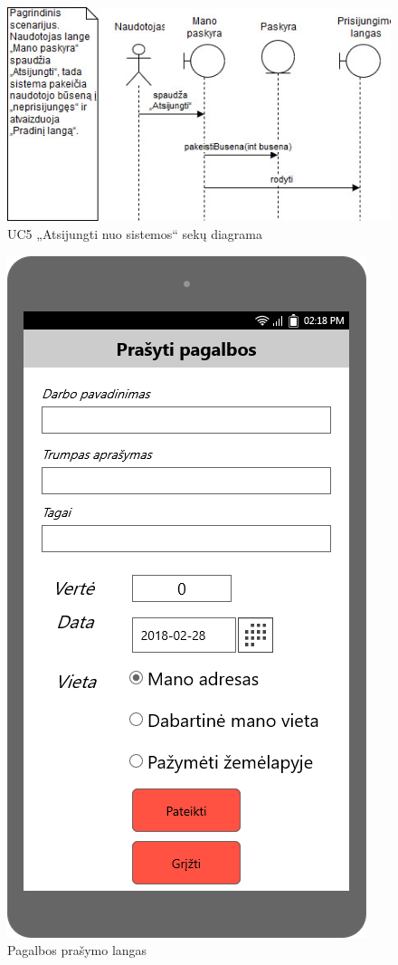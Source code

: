 \documentclass{VUMIFPSbakalaurinis}
\begin{document}
\begin{figure}[H]
	\centering
	\includegraphics[scale=0.6]{img/Sequence/5sequence}
	\caption{UC5 „Atsijungti nuo sistemos“ sekų diagrama}
	\label{img:uc5seq}
\end{figure}

\begin{figure}[H]
	\centering
	\includegraphics[scale=0.4]{img/ScreenShots/Prašyti_pagalbos/00-Prašyti-pagalbos}
	\caption{Pagalbos prašymo langas}
	\label{img:help}
\end{figure}
\end{document}
